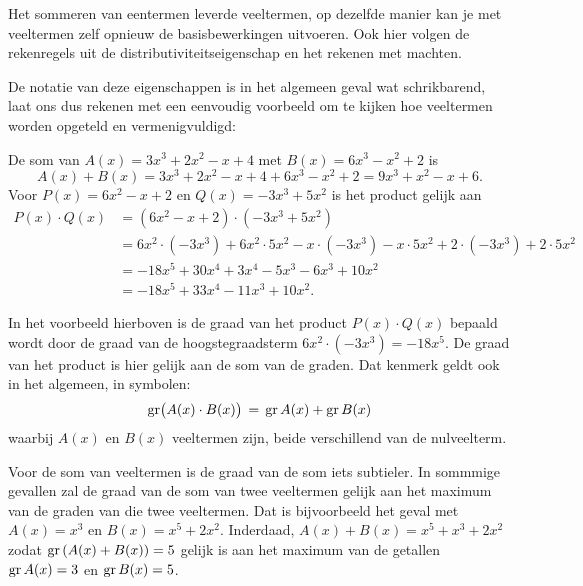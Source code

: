 \documentclass{ximera}
\begin{document}
	\author{Koen de Naeghel - Wiskunde Op Maat}
    \xmsource


Het sommeren van eentermen leverde veeltermen, op dezelfde manier kan je met veeltermen zelf opnieuw de basisbewerkingen uitvoeren. Ook hier volgen de rekenregels uit de distributiviteitseigenschap en het rekenen met machten. 


De notatie van deze eigenschappen is in het algemeen geval wat schrikbarend, laat ons dus rekenen met een eenvoudig voorbeeld om te kijken hoe veeltermen worden opgeteld en vermenigvuldigd: 

\begin{example} 
De som van $A(x) = 3x^3+2x^2-x+4$ met $B(x) = 6x^3-x^2+2$ is  
\[
A(x) + B(x) = 3x^3+2x^2-x+4 + 6x^3-x^2+2 = 9x^3 + x^2 - x + 6.
\]
Voor $P(x) = 6x^2-x+2$ en $Q(x) = -3x^3+5x^2$ is het product gelijk aan
\begin{align*}
P(x) \cdot Q(x) 
& = (6x^2-x+2) \cdot (-3x^3+5x^2) \\
& = 6x^2 \cdot (-3x^3) + 6x^2\cdot 5x^2 - x \cdot(-3x^3) - x \cdot 5x^2 + 2 \cdot(-3x^3) + 2 \cdot 5x^2 \\
& = -18x^5 + 30x^4 + 3x^4 - 5x^3 - 6x^3 + 10x^2 \\
& = -18x^5 + 33x^4 - 11x^3 + 10x^2.
\end{align*}
\end{example} 


In het voorbeeld hierboven is de graad van het product $P(x) \cdot Q(x)$ bepaald wordt door de graad van de hoogstegraadsterm $6x^2 \cdot (-3x^3) = -18 x^{5}$. De graad van het product is hier gelijk aan de som van de graden. Dat kenmerk geldt ook in het algemeen, in symbolen: 
\begin{equation} 
\operatorname{gr}\bigl( A(x) \cdot B(x) \bigr) \, = \, \operatorname{gr} A(x) + \operatorname{gr} B(x)
\end{equation}
waarbij $A(x)$ en $B(x)$ veeltermen zijn, beide verschillend van de nulveelterm. 


Voor de som van veeltermen is de graad van de som iets subtieler. In sommmige gevallen zal de graad van de som van twee veeltermen gelijk aan het maximum van de graden van die twee veeltermen. Dat is bijvoorbeeld het geval met 
$A(x) = x^3$ en $B(x) = x^5 + 2x^2$. Inderdaad, $A(x) + B(x) = x^5 + x^3 + 2x^2$ zodat $\operatorname{gr}\left(A(x) + B(x)\right) = 5$ gelijk is aan het maximum van de getallen $\operatorname{gr} A(x) = 3$ en $\operatorname{gr} B(x) = 5$. %
\end{document}
